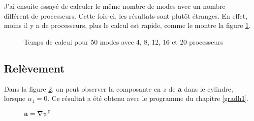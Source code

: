 J'ai ensuite essayé de calculer le même nombre de modes avec un nombre différent de processeurs. Cette fois-ci, les résultats sont plutôt étranges. En effet, moins il y a de processeurs, plus le calcul est rapide, comme le montre la figure \ref{temps_mode}.

\begin{figure}[H]
\caption{Temps de calcul pour 50 modes avec 4, 8, 12, 16 et 20 processeurs}
\label{temps_mode}
\end{figure}

\fi

\subsection{Relèvement}

Dans la figure \ref{az}, on peut observer la composante en $z$ de $\mathbf{a}$ dans le cylindre, lorsque $\alpha_1=0$. Ce résultat a été obtenu avec le programme du chapitre \ref{gradh1}. 

\begin{figure}[H]
\makebox[\textwidth][c]{
  \subfloat{\texttt{[image: az]}}\ 
  \subfloat{\texttt{[image: az1]}}
}
\caption{$\mathbf{a}={\nabla}\psi^0$}
\label{az}
\end{figure}
